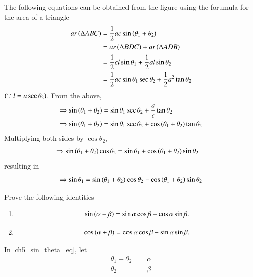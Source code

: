 \proof The following equations can be obtained from the figure using the forumula for the area of a triangle
%
\begin{align}
ar \left(\Delta ABC\right) &= \frac{1}{2}ac \sin\left(\theta_1 + \theta_2\right) \\
&= ar \left(\Delta BDC\right) + ar \left(\Delta ADB\right) \\
&= \frac{1}{2}cl \sin{\theta_1} + \frac{1}{2}al \sin{\theta_2} \\ 
&= \frac{1}{2}ac \sin{\theta_1} \sec \theta_2 + \frac{1}{2}a^2 \tan{\theta_2} 
\end{align}
$\left(\because
	l = a \sec \theta_2\right)$.  From the above,
\begin{align}
\Rightarrow \sin\left(\theta_1 + \theta_2\right) &=  \sin{\theta_1} \sec \theta_2 + \frac{a}{c} \tan{\theta_2} \\
\Rightarrow \sin\left(\theta_1 + \theta_2\right) &=  \sin{\theta_1} \sec \theta_2 + \cos\left(\theta_1 + \theta_2\right) \tan{\theta_2} 
\end{align}
Multiplying both sides by $\cos \theta_2$,
\begin{align}
\Rightarrow \sin\left(\theta_1 + \theta_2\right)\cos{\theta_2} &=  \sin{\theta_1}  + \cos\left(\theta_1 + \theta_2\right) \sin\theta_2  
\end{align}
%
resulting in
\begin{equation}
\Rightarrow \sin \theta_1 = \sin\left(\theta_1 + \theta_2\right)\cos{\theta_2} - \cos\left(\theta_1 + \theta_2\right) \sin\theta_2 
\end{equation}
\begin{problem}
	Prove the following identities 
	\begin{enumerate}
\item 
\begin{equation}
		\label{ch5_sin_diff}
\sin\left(\alpha - \beta\right) = \sin \alpha \cos \beta - \cos \alpha \sin \beta.
\end{equation}
\item 
\begin{equation}
\cos\left(\alpha + \beta\right) = \cos \alpha \cos \beta - \sin \alpha \sin \beta.
		\label{ch5_cos_diff}
\end{equation}

	\end{enumerate}
\end{problem}
\proof In \eqref{ch5_sin_theta_eq}, let
%
\begin{equation}
\begin{split}
\theta_1 + \theta_2 &= \alpha \\
\theta_2 &=  \beta
\end{split}
\end{equation}
